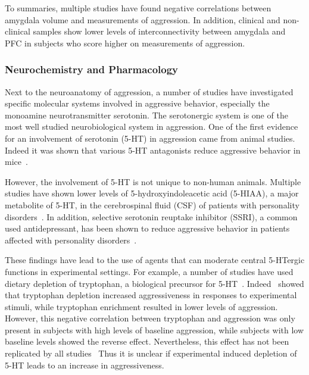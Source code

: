 To summaries, multiple studies have found negative correlations between amygdala volume and measurements of aggression. 
In addition, clinical and non-clinical samples show lower levels of interconnectivity between amygdala and PFC in subjects who score higher on measurements of aggression.

\subsubsection{Neurochemistry and Pharmacology}
\label{ssub:neurochemistry_and_pharmacology}

Next to the neuroanatomy of aggression, a number of studies have investigated specific molecular systems involved in aggressive behavior, especially the monoamine neurotransmitter serotonin.
The serotonergic system is one of the most well studied neurobiological system in aggression.
One of the first evidence for an involvement of serotonin (5-HT) in aggression came from animal studies.
Indeed it was shown that various 5-HT antagonists reduce aggressive behavior in mice~\cite{Malick1976}.

However, the involvement of 5-HT is not unique to non-human animals.
Multiple studies have shown lower levels of 5-hydroxyindoleacetic acid (5-HIAA), a major metabolite of 5-HT, in the cerebrospinal fluid (CSF) of patients with personality disorders~\cite{Brown1982,Brown1979}.
In addition, selective serotonin reuptake inhibitor (SSRI), a common used antidepressant, has been shown to reduce aggressive behavior in patients affected with personality disorders~\cite{Zanarini2004,Coccaro1997a}. 

These findings have lead to the use of agents that can moderate central 5-HTergic functions in experimental settings.
For example, a number of studies have used dietary depletion of tryptophan, a biological precursor for 5-HT~\cite{Williams1999,Carpenter1998}.
Indeed~\citet{Bjork2000} showed that tryptophan depletion increased aggressiveness in responses to experimental stimuli, while tryptophan enrichment resulted in lower levels of aggression.
However, this negative correlation between tryptophan and aggression was only present in subjects with high levels of baseline aggression, while subjects with low baseline levels showed the reverse effect.
Nevertheless, this effect has not been replicated by all studies~\cite{Stadler2008,Kotting2013,Kramer2011}
Thus it is unclear if experimental induced depletion of 5-HT leads to an increase in aggressiveness.

